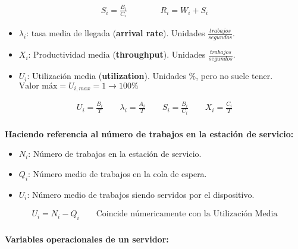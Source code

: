 \documentclass[a4paper,12pt]{article}
\begin{document}
\begin{tcolorbox}[colback=yellow!5!white, colframe=yellow!75!black]
    \begin{align*}
        S_i = \frac{B_i}{C_i} \quad \quad \quad \quad R_i = W_i + S_i
    \end{align*}
\end{tcolorbox}

\begin{itemize}
    \item $\lambda_i$: tasa media de llegada (\textbf{arrival rate}). Unidades $\frac{trabajos}{segundos}$.
    \item $X_i$: Productividad media (\textbf{throughput}). Unidades $\frac{trabajos}{segundos}$.
    \item $U_i$: Utilización media (\textbf{utilization}). Unidades $\%$, pero no suele tener. $\text{Valor máx} = U_{i,max} = 1 \rightarrow 100 \%$
\end{itemize}

\begin{tcolorbox}[colback=yellow!5!white, colframe=yellow!75!black]
    \begin{align*}
        U_i = \frac{B_i}{T} \quad \quad \lambda_i = \frac{A_i}{T} \quad \quad S_i = \frac{B_i}{C_i} \quad \quad X_i = \frac{C_i}{T} \\
    \end{align*}
\end{tcolorbox}

\textbf{Haciendo referencia al número de trabajos en la estación de servicio:}
\begin{itemize}
    \item $N_i$: Número de trabajos en la estación de servicio.
    \item $Q_i$: Número medio de trabajos en la cola de espera.
    \item $U_i$: Número medio de trabajos siendo servidos por el dispositivo.
\end{itemize}

\begin{tcolorbox}[colback=yellow!5!white, colframe=yellow!75!black]
    \begin{align*}
        U_i = N_i - Q_i \quad \quad \text{Coincide númericamente con la Utilización Media}\\
    \end{align*}
\end{tcolorbox}

\textbf{Variables operacionales de un servidor:}
\end{document}
